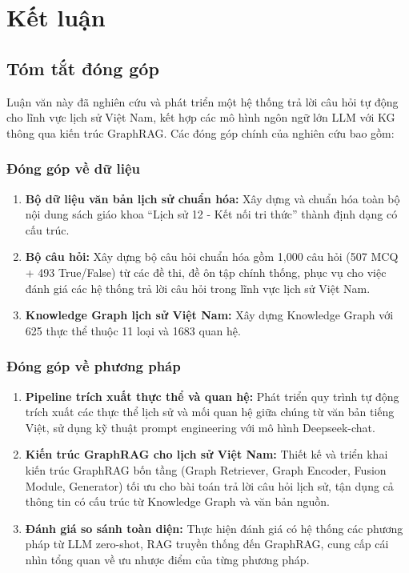 \chapter{Kết luận}
\label{chap:conclusion}

\section{Tóm tắt đóng góp}

Luận văn này đã nghiên cứu và phát triển một hệ thống trả lời câu hỏi tự động cho lĩnh vực lịch sử Việt Nam, kết hợp các mô hình ngôn ngữ lớn LLM với KG thông qua kiến trúc GraphRAG. Các đóng góp chính của nghiên cứu bao gồm:

\subsection{Đóng góp về dữ liệu}

\begin{enumerate}
    \item \textbf{Bộ dữ liệu văn bản lịch sử chuẩn hóa:} Xây dựng và chuẩn hóa toàn bộ nội dung sách giáo khoa ``Lịch sử 12 - Kết nối tri thức'' thành định dạng có cấu trúc.
    
    \item \textbf{Bộ câu hỏi:} Xây dựng bộ câu hỏi chuẩn hóa gồm 1,000 câu hỏi (507 MCQ + 493 True/False) từ các đề thi, đề ôn tập chính thống, phục vụ cho việc đánh giá các hệ thống trả lời câu hỏi trong lĩnh vực lịch sử Việt Nam.
    
    \item \textbf{Knowledge Graph lịch sử Việt Nam:} Xây dựng Knowledge Graph với 625 thực thể thuộc 11 loại và 1683 quan hệ.
\end{enumerate}

\subsection{Đóng góp về phương pháp}

\begin{enumerate}
    \item \textbf{Pipeline trích xuất thực thể và quan hệ:} Phát triển quy trình tự động trích xuất các thực thể lịch sử và mối quan hệ giữa chúng từ văn bản tiếng Việt, sử dụng kỹ thuật prompt engineering với mô hình Deepseek-chat.
    
    \item \textbf{Kiến trúc GraphRAG cho lịch sử Việt Nam:} Thiết kế và triển khai kiến trúc GraphRAG bốn tầng (Graph Retriever, Graph Encoder, Fusion Module, Generator) tối ưu cho bài toán trả lời câu hỏi lịch sử, tận dụng cả thông tin có cấu trúc từ Knowledge Graph và văn bản nguồn.
    
    \item \textbf{Đánh giá so sánh toàn diện:} Thực hiện đánh giá có hệ thống các phương pháp từ LLM zero-shot, RAG truyền thống đến GraphRAG, cung cấp cái nhìn tổng quan về ưu nhược điểm của từng phương pháp.
\end{enumerate}


